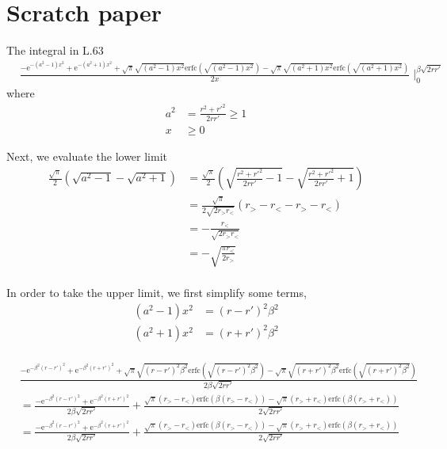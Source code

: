 \documentclass[paper=a4, fontsize=11pt]{article} %
\numberwithin{equation}{section} %
\numberwithin{figure}{section} %
\numberwithin{table}{section} %
\newcommand{\re}{{\mathrm{e}}}
\newcommand{\rerfc}{{\mathrm{erfc}}}
\begin{document}
\section{Scratch paper}
The integral in L.63
\begin{equation}
\begin{split}
&\frac{-\re^{-(a^2 -1) x^2} + \re^{-(a^2 + 1) x^2} +\sqrt{\pi}\sqrt{(a^2 -1)x^2}\rerfc\left(\sqrt{(a^2 -1)x^2}\right) - \sqrt{\pi}\sqrt{(a^2 +1)x^2}\rerfc\left(\sqrt{(a^2 +1)x^2}\right) }{2x} \mid_0^{\beta\sqrt{2rr'}} \nonumber
\end{split}
\end{equation}
where
\begin{equation}
\begin{split}
a^2 &= \frac{r^2 + r'^2}{2rr'} \geq 1 \\
x &\geq 0
\end{split}
\end{equation}

Next, we evaluate the lower limit
\begin{equation}
\begin{split}
\frac{\sqrt{\pi}}{2}\left(\sqrt{a^2 -1} - \sqrt{a^2 + 1}\right)
&= \frac{\sqrt{\pi}}{2}\left(\sqrt{\frac{r^2 + r'^2}{2rr'} -1} - \sqrt{\frac{r^2 + r'^2}{2rr'} + 1}\right)\\
&= \frac{\sqrt{\pi}}{2\sqrt{2r_>r_<}} \left(r_> - r_< - r_> - r_<\right)\\
&= -\frac{r_<}{\sqrt{2r_>r_<}} \\
&= -\sqrt{\frac{\pi r_<}{2r_>}} \\
\end{split}
\end{equation}

In order to take the upper limit, we first simplify some terms,
\begin{equation}
\begin{split}
(a^2 - 1)x^2
&= (r-r')^2 \beta^2 \\
(a^2 + 1)x^2
&= (r+r')^2 \beta^2 \\
\end{split}
\end{equation}

\begin{equation}
\begin{split}
&\frac{-\re^{-\beta^2(r-r')^2 } + \re^{-\beta^2(r+r')^2 } +\sqrt{\pi}\sqrt{(r-r')^2 \beta^2}\rerfc\left(\sqrt{(r-r')^2 \beta^2}\right) - \sqrt{\pi}\sqrt{(r+r')^2 \beta^2}\rerfc\left(\sqrt{(r+r')^2 \beta^2}\right) }{2\beta \sqrt{2 r r'}} \\
&= \frac{-\re^{-\beta^2(r-r')^2 } + \re^{-\beta^2(r+r')^2 }}{2\beta \sqrt{2 r r'}} + \frac{\sqrt{\pi}(r_> - r_<)\rerfc\left(\beta(r_> - r_<)\right) - \sqrt{\pi}(r_> + r_<)\rerfc\left(\beta(r_> + r_<)\right)}{2\sqrt{2rr'}}\\
&= \frac{-\re^{-\beta^2(r-r')^2 } + \re^{-\beta^2(r+r')^2 }}{2\beta \sqrt{2 r r'}} + \frac{\sqrt{\pi}(r_> - r_<)\rerfc\left(\beta(r_> - r_<)\right) - \sqrt{\pi}(r_> + r_<)\rerfc\left(\beta(r_> + r_<)\right)}{2\sqrt{2rr'}} \nonumber
\end{split}
\end{equation}
\end{document}
